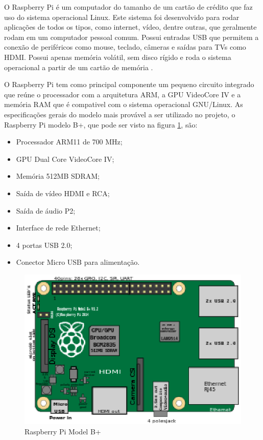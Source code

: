 O Raspberry Pi é um computador do tamanho de um cartão de crédito que faz uso do sistema operacional Linux. Este sistema foi desenvolvido para rodar aplicações de todos os tipos, como internet, vídeo, dentre outras, que geralmente rodam em um computador pessoal comum. Possui entradas USB que permitem a conexão de periféricos como mouse, teclado, câmeras e saídas para TVs como HDMI. Possui apenas memória volátil, sem disco rígido e roda o sistema operacional a partir de um cartão de memória \cite{rasp_foundation}.

O Raspberry Pi tem como principal componente um pequeno circuito integrado que reúne o processador com a arquitetura ARM, a GPU VideoCore IV e a memória RAM que é compativel com o sistema operacional GNU/Linux. As especificações gerais do modelo mais provável a ser utilizado no projeto, o Raspberry Pi modelo B+, que pode ser visto na figura \ref{rasp}, são:

\begin{itemize}
	\item Processador ARM11 de 700 MHz;
	\item GPU Dual Core VideoCore IV;
	\item Memória 512MB SDRAM;
	\item Saída de vídeo HDMI e RCA;
	\item Saída de áudio P2;
	\item Interface de rede Ethernet;
	\item 4 portas USB 2.0;
	\item Conector Micro USB para alimentação.
\end{itemize}

\begin{figure}[!htb]
	\centering
	\includegraphics[keepaspectratio=true,scale=0.5]{figuras/referencialteorico/raspberry.eps}
	\caption{Raspberry Pi Model B+}
	\label{rasp}
\end{figure}


